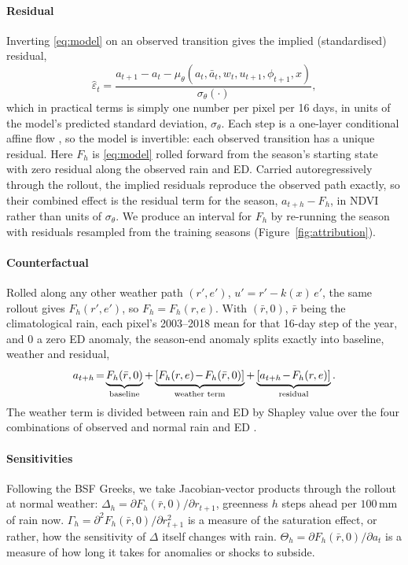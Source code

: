 \documentclass[letterpaper]{article} %
\begin{document}
\paragraph{Residual} Inverting \eqref{eq:model} on an observed transition gives the implied (standardised) residual,
\begin{equation}
\hat\varepsilon_t = \frac{a_{t+1} - a_t - \mu_\theta(a_t,\bar a_t,w_t,u_{t+1},\phi_{t+1},x)}{\sigma_\theta(\cdot)},
\label{eq:implied}
\end{equation}
which in practical terms is simply one number per pixel per 16 days, in units of the model's predicted standard deviation, $\sigma_\theta$. Each step is a one-layer conditional affine flow \citep{papamakarios2021}, so the model is invertible: each observed transition has a unique residual. Here $F_h$ is \eqref{eq:model} rolled forward from the season's starting state with zero residual along the observed rain and ED. Carried autoregressively through the rollout, the implied residuals reproduce the observed path exactly, so their combined effect is the residual term for the season, $a_{t+h}-F_h$, in NDVI rather than units of $\sigma_\theta$. We produce an interval for $F_h$ by re-running the season with residuals resampled from the training seasons (Figure~\ref{fig:attribution}). 


\paragraph{Counterfactual} 

Rolled along any other weather path $(r',e')$, $u'=r'-k(x)\,e'$, the same rollout gives $F_h(r',e')$, so $F_h=F_h(r,e)$. With $(\bar r,0)$, $\bar r$ being the climatological rain, each pixel's 2003--2018 mean for that 16-day step of the year, and $0$ a zero ED anomaly, the season-end anomaly splits exactly into baseline, weather and residual,
\begin{equation}
\medmuskip=1.5mu\thickmuskip=2.5mu
a_{t+h}=\underbrace{F_h(\bar r,0)}_{\text{baseline}}+\underbrace{[F_h(r,e)-F_h(\bar r,0)]}_{\text{weather term}}+\underbrace{[a_{t+h}-F_h(r,e)]}_{\text{residual}}.
\label{eq:split}
\end{equation}
The weather term is divided between rain and ED by Shapley value over the four combinations of observed and normal rain and ED \citep{shapley1953}. 

\paragraph{Sensitivities}
Following the BSF Greeks, we take Jacobian-vector products through the rollout at normal weather: $\Delta_h=\partial F_h(\bar r,0)/\partial r_{t+1}$, greenness $h$ steps ahead per $100$\,mm of rain now. $\Gamma_h=\partial^2F_h(\bar r,0)/\partial r_{t+1}^2$ is a measure of the saturation effect, or rather, how the sensitivity of $\Delta$ itself changes with rain. $\Theta_h=\partial F_h(\bar r,0)/\partial a_t$ is a measure of how long it takes for anomalies or shocks to subside.
\end{document}
